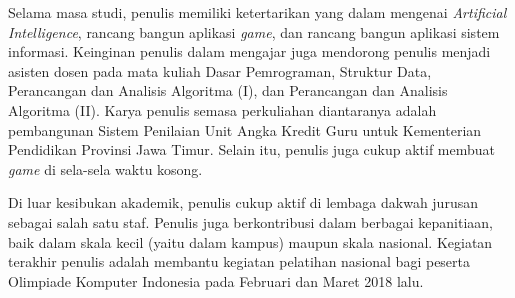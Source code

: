 Selama masa studi, penulis memiliki ketertarikan yang dalam mengenai \textit{Artificial Intelligence}, rancang bangun aplikasi \textit{game}, dan rancang bangun aplikasi sistem informasi. Keinginan penulis dalam mengajar juga mendorong penulis menjadi asisten dosen pada mata kuliah Dasar Pemrograman, Struktur Data, Perancangan dan Analisis Algoritma (I), dan Perancangan dan Analisis Algoritma (II). Karya penulis semasa perkuliahan diantaranya adalah pembangunan Sistem Penilaian Unit Angka Kredit Guru untuk Kementerian Pendidikan Provinsi Jawa Timur. Selain itu, penulis juga cukup aktif membuat \textit{game} di sela-sela waktu kosong.

Di luar kesibukan akademik, penulis cukup aktif di lembaga dakwah jurusan sebagai salah satu staf. Penulis juga berkontribusi dalam berbagai kepanitiaan, baik dalam skala kecil (yaitu dalam kampus) maupun skala nasional. Kegiatan terakhir penulis adalah membantu kegiatan pelatihan nasional bagi peserta Olimpiade Komputer Indonesia pada Februari dan Maret 2018 lalu.

